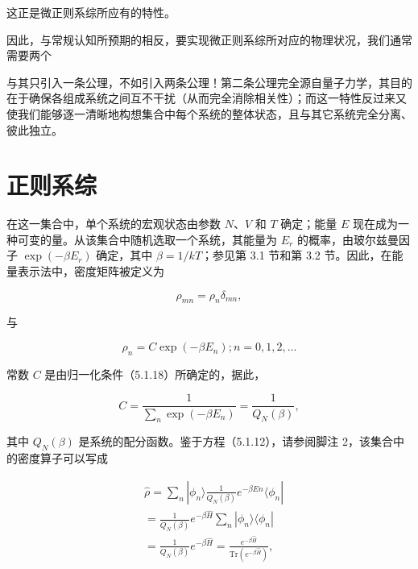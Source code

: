 这正是微正则系综所应有的特性。

因此，与常规认知所预期的相反，要实现微正则系综所对应的物理状况，我们通常需要两个

与其只引入一条公理，不如引入两条公理！第二条公理完全源自量子力学，其目的在于确保各组成系统之间互不干扰（从而完全消除相关性）；而这一特性反过来又使我们能够逐一清晰地构想集合中每个系统的整体状态，且与其它系统完全分离、彼此独立。

\section{正则系综}\label{b-ux5e38ux89c4ux7cfbux7efc}

在这一集合中，单个系统的宏观状态由参数 \(N\)、\(V\) 和 \(T\) 确定；能量 \(E\) 现在成为一种可变的量。从该集合中随机选取一个系统，其能量为 \(E_r\) 的概率，由玻尔兹曼因子 \(\exp(-\beta E_r)\) 确定，其中 \(\beta = 1/kT\)；参见第 3.1 节和第 3.2 节。因此，在能量表示法中，密度矩阵被定义为

\begin{equation}\tag{5.2.8}\label{eq:5.2.8}
\rho _ { m n } = \rho _ { n } \delta _ { m n } ,
\end{equation}

与

\begin{equation}\tag{5.2.9}\label{eq:5.2.9}
\rho _ { n } = C \exp { ( - \beta E _ { n } ) } ;  n = 0 , 1 , 2 , \ldots
\end{equation}

常数 \(C\) 是由归一化条件（5.1.18）所确定的，据此，

\begin{equation}\tag{5.2.10}\label{eq:5.2.10}
C = \frac { 1 } { \sum _ { n } \exp { ( - \beta E _ { n } ) } } = \frac { 1 } { Q _ { N } ( \beta ) } ,
\end{equation}

其中 \(Q_{N}(\beta)\) 是系统的配分函数。鉴于方程（5.1.12），请参阅脚注 2，该集合中的密度算子可以写成

\begin{equation}\tag{5.2.11}\label{eq:5.2.11}
\begin{array}{rl} & { \hat { \rho } = \sum _ { n } | \phi _ { n } \rangle \frac { 1 } { Q _ { N } ( \beta ) } e ^{- \beta E n} \langle \phi _ { n } | } \\& { = \frac { 1 } { Q _ { N } ( \beta ) } e ^{- \beta \hat { H} } \sum _ { n } | \phi _ { n } \rangle \langle \phi _ { n } | } \\& { = \frac { 1 } { Q _ { N } ( \beta ) } e ^{- \beta \hat { H} } = \frac { e ^{- \beta \hat { H} } } { \mathrm { T r } \left( e ^{- \beta \hat { H} } \right) } , } \end{array}
\end{equation}

